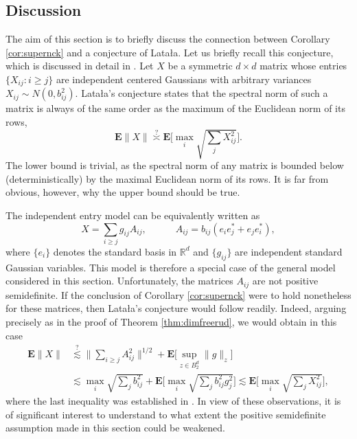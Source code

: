 \documentclass[10pt,reqno]{amsart}
\theoremstyle{definition}
\numberwithin{equation}{section}
\numberwithin{figure}{section}
\numberwithin{table}{section}
\begin{document}
\subsection{Discussion}
\label{sec:disc}

The aim of this section is to briefly discuss the connection between 
Corollary \ref{cor:supernck} and a conjecture of Lata{\l}a. Let us briefly 
recall this conjecture, which is discussed in detail in \cite{vH16b}.
Let $X$ be a symmetric $d\times d$ matrix whose entries $\{X_{ij}:i\ge j\}$
are independent centered Gaussians with arbitrary variances 
$X_{ij}\sim N(0,b_{ij}^2)$. Lata{\l}a's conjecture states that the 
spectral norm of such a matrix is always of the same order as the maximum 
of the Euclidean norm of its rows,
$$
	\mathbf{E}\|X\| \stackrel{?}{\asymp}
	\mathbf{E}\Bigg[\max_i\sqrt{\sum_j X_{ij}^2}\Bigg].
$$
The lower bound is trivial, as the spectral norm of any matrix is bounded 
below (deterministically) by the maximal Euclidean norm of its rows. It is 
far from obvious, however, why the upper bound should be true.

The independent entry model can be equivalently written as
$$
	X = \sum_{i\ge j} g_{ij}A_{ij},\qquad\quad
	A_{ij} = b_{ij}(e_ie_j^*+e_je_i^*),
$$
where $\{e_i\}$ denotes the standard basis in $\mathbb{R}^d$ and
$\{g_{ij}\}$ are independent standard Gaussian variables. This model is 
therefore a special case of the general model considered in this section.
Unfortunately, the matrices $A_{ij}$ are not positive semidefinite. If the 
conclusion of Corollary \ref{cor:supernck} were to hold nonetheless for 
these matrices, then Lata{\l}a's conjecture would follow readily.
Indeed, arguing precisely as in the proof of Theorem \ref{thm:dimfreerud}, 
we would obtain in this case
\begin{align*}
	\mathbf{E}\|X\| &\stackrel{?}{\lesssim}
	\Bigg\|\sum_{i\ge j} A_{ij}^2\Bigg\|^{1/2} +
	\mathbf{E}\bigg[\sup_{z\in B_2^d}\|g\|_z\bigg]
	\\
	&\lesssim
	\max_i\sqrt{\sum_j b_{ij}^2} +
	\mathbf{E}\Bigg[
	\max_i
	\sqrt{\sum_{j} b_{ij}^2 g_j^2}
	\Bigg]
	\lesssim
	\mathbf{E}\Bigg[\max_i\sqrt{\sum_j X_{ij}^2}\Bigg],
\end{align*}
where the last inequality was established in \cite{vH16b}. In view of 
these observations, it is of significant interest to understand to what 
extent the positive semidefinite assumption made in this section could be 
weakened.
\end{document}
